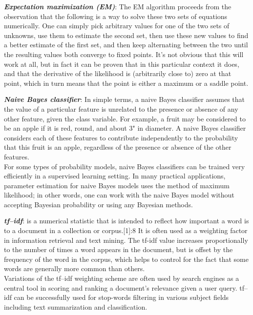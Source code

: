 \documentclass[12pt]{book}
\begin{document}
\begin{enumerate*}
  \item \textbf{\textit {Expectation maximization (EM)}}: The EM algorithm proceeds from the observation that the following is a way to solve these two sets of equations numerically. One can simply pick arbitrary values for one of the two sets of unknowns, use them to estimate the second set, then use these new values to find a better estimate of the first set, and then keep alternating between the two until the resulting values both converge to fixed points. It's not obvious that this will work at all, but in fact it can be proven that in this particular context it does, and that the derivative of the likelihood is (arbitrarily close to) zero at that point, which in turn means that the point is either a maximum or a saddle point.
  \item \textbf{\textit {Naive Bayes classifier}}: In simple terms, a naive Bayes classifier assumes that the value of a particular feature is unrelated to the presence or absence of any other feature, given the class variable. For example, a fruit may be considered to be an apple if it is red, round, and about 3" in diameter. A naive Bayes classifier considers each of these features to contribute independently to the probability that this fruit is an apple, regardless of the presence or absence of the other features.\\For some types of probability models, naive Bayes classifiers can be trained very efficiently in a supervised learning setting. In many practical applications, parameter estimation for naive Bayes models uses the method of maximum likelihood; in other words, one can work with the naive Bayes model without accepting Bayesian probability or using any Bayesian methods.
  \item \textbf{\textit {tf–idf}}:  is a numerical statistic that is intended to reflect how important a word is to a document in a collection or corpus.[1]:8 It is often used as a weighting factor in information retrieval and text mining. The tf-idf value increases proportionally to the number of times a word appears in the document, but is offset by the frequency of the word in the corpus, which helps to control for the fact that some words are generally more common than others.\\ Variations of the tf–idf weighting scheme are often used by search engines as a central tool in scoring and ranking a document's relevance given a user query. tf–idf can be successfully used for stop-words filtering in various subject fields including text summarization and classification.

\end{enumerate*}
\end{document}
